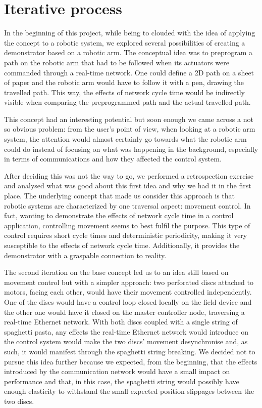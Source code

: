 \section{Iterative process}

In the beginning of this project, while being to clouded with the idea of applying the concept to a robotic system, we explored several possibilities of creating a demonstrator based on a robotic arm.
The conceptual idea was to preprogram a path on the robotic arm that had to be followed when its actuators were commanded through a real-time network.
One could define a 2D path on a sheet of paper and the robotic arm would have to follow it with a pen, drawing the travelled path.
This way, the effects of network cycle time would be indirectly visible when comparing the preprogrammed path and the actual travelled path.

This concept had an interesting potential but soon enough we came across a not so obvious problem: from the user's point of view, when looking at a robotic arm system, the attention would almost certainly go towards what the robotic arm could do instead of focusing on what was happening in the background, especially in terms of communications and how they affected the control system.

After deciding this was not the way to go, we performed a retrospection exercise and analysed what was good about this first idea and why we had it in the first place.
The underlying concept that made us consider this approach is that robotic systems are characterized by one traversal aspect: movement control.
In fact, wanting to demonstrate the effects of network cycle time in a control application, controlling movement seems to best fulfil the purpose.
This type of control requires short cycle times and deterministic periodicity, making it very susceptible to the effects of network cycle time.
Additionally, it provides the demonstrator with a graspable connection to reality.

The second iteration on the base concept led us to an idea still based on movement control but with a simpler approach: two perforated discs attached to motors, facing each other, would have their movement controlled independently.
One of the discs would have a control loop closed locally on the field device and the other one would have it closed on the master controller node, traversing a real-time Ethernet network.
With both discs coupled with a single string of spaghetti pasta, any effects the real-time Ethernet network would introduce on the control system would make the two discs' movement desynchronise and, as such, it would manifest through the spaghetti string breaking.
We decided not to pursue this idea further because we expected, from the beginning, that the effects introduced by the communication network would have a small impact on performance and that, in this case, the spaghetti string would possibly have enough elasticity to withstand the small expected position slippages between the two discs.

